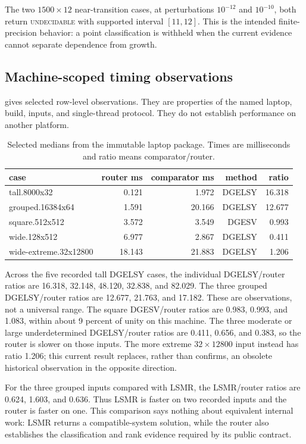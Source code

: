 \documentclass[11pt]{article}
\theoremstyle{definition}
\begin{document}
The two $1500\times12$ near-transition cases, at perturbations $10^{-12}$ and $10^{-10}$,
both return \textsc{undecidable} with supported interval $[11,12]$. This is
the intended finite-precision behavior: a point classification is withheld
when the current evidence cannot separate dependence from growth.

\subsection{Machine-scoped timing observations}
 gives selected row-level observations. They are
properties of the named laptop, build, inputs, and single-thread protocol.
They do not establish performance on another platform.

\begin{table}[ht]
\centering
\caption{Selected medians from the immutable laptop package. Times are
milliseconds and ratio means comparator/router.}
\label{tab:reference-timings}
\small
\begin{tabular}{lrrrr}
\toprule
case & router ms & comparator ms & method & ratio\\
\midrule
tall.8000x32 & 0.121 & 1.972 & DGELSY & 16.318\\
grouped.16384x64 & 1.591 & 20.166 & DGELSY & 12.677\\
square.512x512 & 3.572 & 3.549 & DGESV & 0.993\\
wide.128x512 & 6.977 & 2.867 & DGELSY & 0.411\\
wide-extreme.32x12800 & 18.143 & 21.883 & DGELSY & 1.206\\
\bottomrule
\end{tabular}
\end{table}

Across the five recorded tall DGELSY cases, the individual DGELSY/router
ratios are 16.318, 32.148, 48.120, 32.838, and 82.029. The three grouped
DGELSY/router ratios are 12.677, 21.763, and 17.182. These are observations,
not a universal range. The square DGESV/router ratios are 0.983, 0.993, and
1.083, within about 9 percent of unity on this machine. The three moderate or large
underdetermined DGELSY/router ratios are 0.411, 0.656, and 0.383, so the router
is slower on those inputs. The more extreme $32\times12800$ input instead has ratio 1.206;
this current result replaces, rather than confirms, an obsolete
historical observation in the opposite direction.

For the three grouped inputs compared with LSMR, the LSMR/router ratios are 0.624, 1.603, and 0.636.
Thus LSMR is faster on two recorded inputs and the
router is faster on one. This comparison says nothing about equivalent
internal work: LSMR returns a compatible-system solution, while the router
also establishes the classification and rank evidence required by its public
contract.
\end{document}
